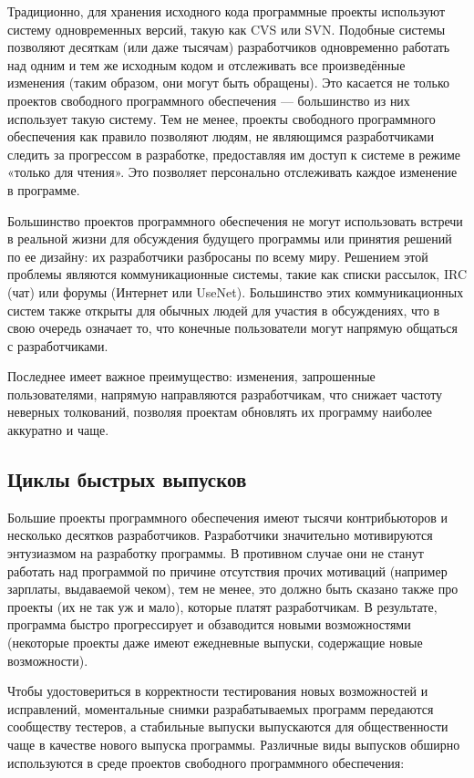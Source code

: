 \documentclass[10pt]{book}
\begin{document}
Традиционно, для хранения исходного кода программные проекты используют систему одновременных версий, такую как CVS или SVN. Подобные системы позволяют десяткам (или  даже тысячам) разработчиков одновременно работать над одним и тем же исходным кодом  и отслеживать все произведённые изменения (таким образом, они могут быть обращены). Это касается не только проектов свободного программного обеспечения — большинство из них использует такую систему. Тем не менее, проекты свободного программного обеспечения как правило позволяют людям, не являющимся разработчиками следить за прогрессом в разработке, предоставляя им доступ к системе в режиме «только для чтения». Это позволяет персонально отслеживать каждое изменение в программе. 

Большинство проектов программного обеспечения не могут использовать встречи в реальной жизни для обсуждения будущего программы или принятия решений по ее дизайну: их разработчики разбросаны по всему миру. Решением этой проблемы являются коммуникационные системы, такие как списки рассылок, IRC (чат) или форумы (Интернет или UseNet).  Большинство этих коммуникационных систем также открыты для обычных людей для участия в обсуждениях, что в свою очередь означает то, что конечные пользователи могут напрямую общаться с разработчиками. 

Последнее имеет важное преимущество: изменения, запрошенные пользователями, напрямую направляются разработчикам, что снижает частоту неверных толкований, позволяя проектам обновлять их программу наиболее аккуратно и чаще. 

\subsection{Циклы быстрых выпусков}

Большие проекты программного обеспечения имеют тысячи контрибьюторов и несколько десятков разработчиков. Разработчики значительно мотивируются энтузиазмом на разработку программы. В противном случае они не станут работать над программой по причине отсутствия прочих мотиваций (например  зарплаты, выдаваемой чеком), тем не менее, это должно быть сказано также про проекты (их не так уж и мало), которые платят разработчикам. В результате, программа быстро прогрессирует и обзаводится новыми возможностями (некоторые проекты даже имеют ежедневные выпуски, содержащие новые возможности). 

Чтобы удостовериться в корректности тестирования новых возможностей и исправлений, моментальные снимки разрабатываемых программ передаются сообществу тестеров, а стабильные выпуски выпускаются для общественности чаще в качестве нового выпуска программы. Различные виды выпусков обширно используются в среде проектов свободного программного обеспечения:
\end{document}
